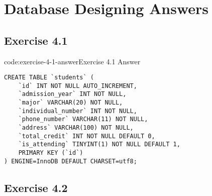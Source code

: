 \section{Database Designing Answers}\label{sect:database-designing-answers}

\subsection*{Exercise 4.1}

\begin{codeenv}{code:exercise-4-1-answer}{Exercise 4.1 Answer}\begin{verbatim}
CREATE TABLE `students` (
    `id` INT NOT NULL AUTO_INCREMENT,
    `admission_year` INT NOT NULL,
    `major` VARCHAR(20) NOT NULL,
    `individual_number` INT NOT NULL,
    `phone_number` VARCHAR(11) NOT NULL,
    `address` VARCHAR(100) NOT NULL,
    `total_credit` INT NOT NULL DEFAULT 0,
    `is_attending` TINYINT(1) NOT NULL DEFAULT 1,
    PRIMARY KEY (`id`)
) ENGINE=InnoDB DEFAULT CHARSET=utf8;
\end{verbatim}
\end{codeenv}

\subsection*{Exercise 4.2}

